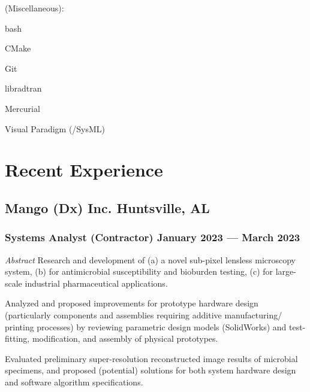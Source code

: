 \documentclass[letterpaper, oneside, 10pt]{article}
\begin{document}
\begin{multicols}{2}
{  {\jostmedium (Miscellaneous):}%
    \begin{itemize*}[%
      label=\relax, labelwidth=0pt, itemjoin=\space\char"00B7%
    ]%
      \item bash%
      \item CMake%
      \item {}%
      \item Git%
      \item {}%
      \item libradtran%
      \item Mercurial%
      \item {}%
      \item Visual Paradigm (/SysML)%
    \end{itemize*}
  }
\end{multicols}

\section*{Recent Experience} %

\hfill
\vspace{-24pt}

\subsection*{Mango (Dx) Inc.\DotSep{0.25em} Huntsville, AL}
\subsubsection*{%
  Systems Analyst (Contractor)\DotSep{0.25em} January 2023 --- March 2023
}

\textit{Abstract}\DotSep{0.25em} Research and development of (a) a novel
sub-pixel lensless microscopy system, (b) for antimicrobial susceptibility and
bioburden testing, (c) for large-scale industrial pharmaceutical applications.

Analyzed and proposed improvements for prototype hardware design (particularly
components and assemblies requiring additive manufacturing/ printing
processes) by reviewing parametric design models (SolidWorks) and test-fitting,
modification, and assembly of physical prototypes.

Evaluated preliminary super-resolution reconstructed image results of microbial
specimens, and proposed (potential) solutions for both system hardware design
and software algorithm specifications.
\end{document}
